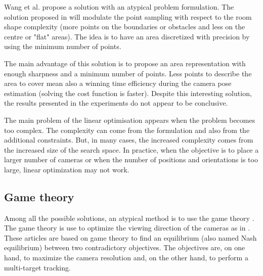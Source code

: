 Wang et al. \cite{181*wang2017} propose a solution with an atypical problem formulation. The solution proposed in \cite{181*wang2017} will modulate the point sampling with respect to the room shape complexity (more points on the boundaries or obstacles and less on the centre or "flat" areas). The idea is to have an area discretized with precision by using the minimum number of points. 
                               
The main advantage of this solution is to propose an area representation with enough sharpness and a minimum number of points. Less points to describe the area to cover mean also a winning time efficiency  during the camera pose estimation (solving the cost function is faster).
Despite this interesting solution, the results presented in the experiments do not appear to be conclusive.  

The main problem of the linear optimisation appears when the problem becomes too complex. The complexity can come from the formulation and also from the additional constraints. But, in many cases, the increased complexity comes from the increased size of the search space. In practice, when the objective is to place a larger number of cameras or when the number of positions and orientations is too large, linear optimization may not work. 
	 
	
\subsection{Game theory} 
	 
Among all the possible solutions, an atypical method is to use the game theory \cite{19*li2013}. The game theory is use to optimize the viewing direction of the cameras as in \cite{12*soto2009,18*ding2012,19*li2013,25*song2008}. These articles are based on game theory to find an equilibrium (also named Nash equilibrium) between two contradictory objectives. The objectives are, on one hand, to maximize the camera resolution and, on the other hand, to perform a multi-target tracking.

